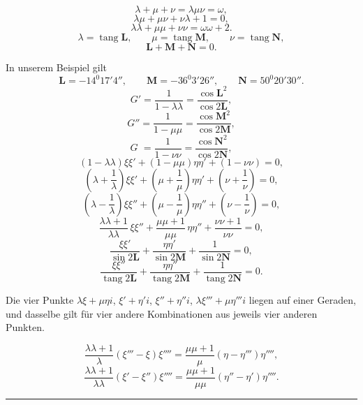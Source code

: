 
\[
\lambda+\mu+\nu=\lambda\mu\nu=\omega,
\]
\[
\lambda\mu+\mu\nu+\nu\lambda+1=0,
\]
\[
\lambda\lambda+\mu\mu+\nu\nu=\omega\omega+2.
\]
\[
\lambda=\operatorname{tang}\boldsymbol{L}, \qquad \mu=\operatorname{tang}\boldsymbol{M}, \qquad \nu=\operatorname{tang}\boldsymbol{N},
\]
\[
\boldsymbol{L}+\boldsymbol{M}+\boldsymbol{N}=0.
\]

In unserem Beispiel gilt
\[
\boldsymbol{L}=-14^{0}17'4'', \qquad \boldsymbol{M}=-36^{0}3'26'', \qquad \boldsymbol{N}=50^{0}20'30''.
\]
\[
G'=\frac{1}{1-\lambda\lambda}=\frac{\cos \boldsymbol{L}^{2}}{\cos 2\boldsymbol{L}},
\]
\[
G''=\frac{1}{1-\mu\mu}=\frac{\cos \boldsymbol{M}^{2}}{\cos 2\boldsymbol{M}},
\]
\[
G\phantom{'}=\frac{1}{1-\nu\nu}=\frac{\cos \boldsymbol{N}^{2}}{\cos 2\boldsymbol{N}},
\]
\[
(1-\lambda\lambda)\xi\xi'+(1-\mu\mu)\eta\eta'+(1-\nu\nu)=0,
\]
\[
\left(\lambda+\frac{1}{\lambda}\right)\xi\xi'+\left(\mu+\frac{1}{\mu}\right)\eta\eta'+\left(\nu+\frac{1}{\nu}\right)=0,
\]
\[
\left(\lambda-\frac{1}{\lambda}\right)\xi\xi''+\left(\mu-\frac{1}{\mu}\right)\eta\eta''+\left(\nu-\frac{1}{\nu}\right)=0,
\]
\[
\frac{\lambda\lambda+1}{\lambda\lambda}\,\xi\xi''+\frac{\mu\mu+1}{\mu\mu}\,\eta\eta''+\frac{\nu\nu+1}{\nu\nu}=0,
\]
\[
\frac{\xi\xi'}{\sin 2\boldsymbol{L}}+\frac{\eta\eta'}{\sin 2\boldsymbol{M}}+\frac{1}{\sin 2\boldsymbol{N}}=0,
\]
\[
\frac{\xi\xi''}{\operatorname{tang} 2\boldsymbol{L}}+\frac{\eta\eta''}{\operatorname{tang} 2\boldsymbol{M}}+\frac{1}{\operatorname{tang} 2\boldsymbol{N}}=0.
\]

Die vier Punkte $\lambda\xi+\mu\eta i$, $\xi'+\eta'i$, $\xi''+\eta''i$, $\lambda\xi'''+\mu\eta'''i$ liegen auf einer Geraden, und dasselbe
gilt für vier andere Kombinationen aus jeweils vier anderen Punkten.

\[
\frac{\lambda\lambda+1}{\lambda}(\xi'''-\xi)\xi''''=\frac{\mu\mu+1}{\mu}(\eta-\eta''')\eta'''',
\]
\[
\frac{\lambda\lambda+1}{\lambda\lambda}(\xi'-\xi'')\xi''''=\frac{\mu\mu+1}{\mu\mu}(\eta''-\eta')\eta''''.
\]

\begin{center}\rule{3cm}{.4pt}\end{center}
